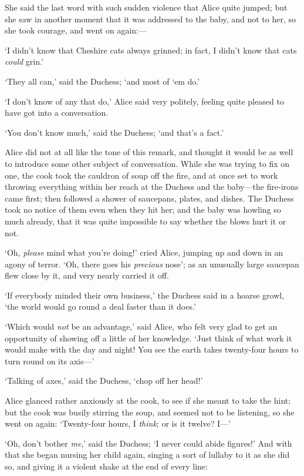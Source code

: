 \documentclass[12pt,openany]{memoir}
\begin{document}
She said the last word with such sudden violence that Alice quite jumped; but she saw in another moment that it was addressed to the baby, and not to her, so she took courage, and went on again:---

`I didn't know that Cheshire cats always grinned; in fact, I didn't know that cats \textit{could} grin.'

`They all can,' said the Duchess; `and most of `em do.'

`I don't know of any that do,' Alice said very politely, feeling quite pleased to have got into a conversation.

`You don't know much,' said the Duchess; `and that's a fact.'

Alice did not at all like the tone of this remark, and thought it would be as well to introduce some other subject of conversation. While she was trying to fix on one, the cook took the cauldron of soup off the fire, and at once set to work throwing everything within her reach at the Duchess and the baby---the fire-irons came first; then followed a shower of saucepans, plates, and dishes. The Duchess took no notice of them even when they hit her; and the baby was howling so much already, that it was quite impossible to say whether the blows hurt it or not.

`Oh, \textit{please} mind what you're doing!' cried Alice, jumping up and down in an agony of terror. `Oh, there goes his \textit{precious} nose'; as an unusually large saucepan flew close by it, and very nearly carried it off.

`If everybody minded their own business,' the Duchess said in a hoarse growl, `the world would go round a deal faster than it does.'

`Which would \textit{not} be an advantage,' said Alice, who felt very glad to get an opportunity of showing off a little of her knowledge. `Just think of what work it would make with the day and night! You see the earth takes twenty-four hours to turn round on its axis---'

`Talking of axes,' said the Duchess, `chop off her head!'

Alice glanced rather anxiously at the cook, to see if she meant to take the hint; but the cook was busily stirring the soup, and seemed not to be listening, so she went on again: `Twenty-four hours, I \textit{think}; or is it twelve? I---'

`Oh, don't bother \textit{me},' said the Duchess; `I never could abide figures!' And with that she began nursing her child again, singing a sort of lullaby to it as she did so, and giving it a violent shake at the end of every line:
\end{document}
